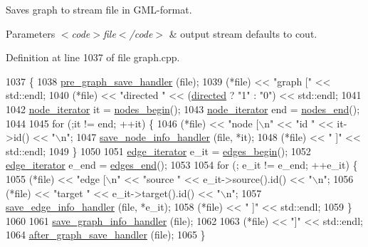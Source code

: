 Saves graph to stream {\ttfamily file} in G\+M\+L-\/format.


\begin{DoxyParams}{Parameters}
{\em $<$code$>$file$<$/code$>$} & output stream defaults to cout. \\
\hline
\end{DoxyParams}


Definition at line 1037 of file graph.\+cpp.


\begin{DoxyCode}
1037                                        \{
1038     \mbox{\hyperlink{classgraph_ab257e02f6fd04fef244032a3a15bec9f}{pre\_graph\_save\_handler}} (file);
1039     (*file) << \textcolor{stringliteral}{"graph ["} << std::endl;
1040     (*file) << \textcolor{stringliteral}{"directed "} << (\mbox{\hyperlink{classgraph_ab4120df210eb3d03d20b0bd27f8cbe8c}{directed}} ? \textcolor{stringliteral}{"1"} : \textcolor{stringliteral}{"0"}) << std::endl;
1041 
1042     \mbox{\hyperlink{classgraph_a2cb374b84c133ce13f94e73c3e5da7fa}{node\_iterator}} it = \mbox{\hyperlink{classgraph_aec053a4b509d1be804237a80044c54c0}{nodes\_begin}}();
1043     \mbox{\hyperlink{classgraph_a2cb374b84c133ce13f94e73c3e5da7fa}{node\_iterator}} end = \mbox{\hyperlink{classgraph_abbf9c0cb5629e98e1142254911238173}{nodes\_end}}();
1044 
1045     \textcolor{keywordflow}{for} (;it != end; ++it) \{
1046     (*file) << \textcolor{stringliteral}{"node [\(\backslash\)n"} << \textcolor{stringliteral}{"id "} << it->id() << \textcolor{stringliteral}{"\(\backslash\)n"};
1047     \mbox{\hyperlink{classgraph_a994f87e1b7f1f723cf03e54e2eb7a99d}{save\_node\_info\_handler}} (file, *it);
1048     (*file) << \textcolor{stringliteral}{" ]"} << std::endl;
1049     \}
1050 
1051     \mbox{\hyperlink{classgraph_a818d3766018eb0af91d520ce2150203c}{edge\_iterator}} e\_it = \mbox{\hyperlink{classgraph_a7ba35a4c4e8343ffb27ed6d9703c6f18}{edges\_begin}}();
1052     \mbox{\hyperlink{classgraph_a818d3766018eb0af91d520ce2150203c}{edge\_iterator}} e\_end = \mbox{\hyperlink{classgraph_aea8d7f976b85b6137f52d915e26639f6}{edges\_end}}();
1053     
1054     \textcolor{keywordflow}{for} (; e\_it != e\_end; ++e\_it) \{
1055     (*file) << \textcolor{stringliteral}{"edge [\(\backslash\)n"} << \textcolor{stringliteral}{"source "} << e\_it->source().id() << \textcolor{stringliteral}{"\(\backslash\)n"};
1056     (*file) << \textcolor{stringliteral}{"target "} << e\_it->target().id() << \textcolor{stringliteral}{"\(\backslash\)n"};
1057     \mbox{\hyperlink{classgraph_a37bb8d0951691e37cdfb271229960f9c}{save\_edge\_info\_handler}} (file, *e\_it);
1058     (*file) << \textcolor{stringliteral}{" ]"} << std::endl;
1059     \}
1060 
1061     \mbox{\hyperlink{classgraph_a0f20022d6f4951b8836a204aa85b7693}{save\_graph\_info\_handler}} (file);
1062 
1063     (*file) << \textcolor{stringliteral}{"]"} << std::endl;
1064     \mbox{\hyperlink{classgraph_af0c7aba21d57d827ae96cae632441651}{after\_graph\_save\_handler}} (file);
1065 \}
\end{DoxyCode}
